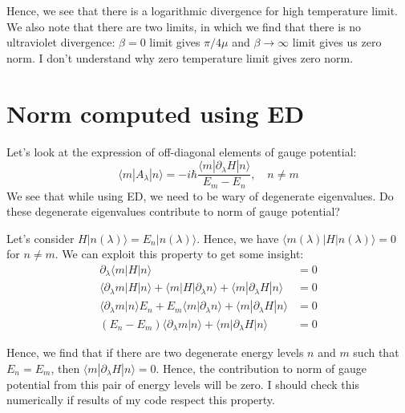\documentclass[11pt,a4paper]{article}
\begin{document}
Hence, we see that there is a logarithmic divergence for high temperature limit. We also note that there are two limits, in which we find that there is no ultraviolet divergence: $\beta =0$ limit gives $\pi/ 4 \mu$ and $\beta \rightarrow \infty$ limit gives us zero norm. I don't understand why zero temperature limit gives zero norm.


\section{Norm computed using ED}

Let's look at the expression of off-diagonal elements of gauge potential:
\begin{equation}
\langle m |A_{\lambda} | n \rangle =  -i \hbar \dfrac{\langle m |\partial_{\lambda}H | n \rangle}{E_m-E_n}, \quad n \neq m
\end{equation}
We see that while using ED, we need to be wary of degenerate eigenvalues. Do these degenerate eigenvalues contribute to norm of gauge potential?

Let's consider $H | n(\lambda) \rangle= E_n  | n(\lambda) \rangle $. Hence, we have $\langle m(\lambda)  |  H | n(\lambda) \rangle=0$ for $n\neq m$. We can exploit this property to get some insight:
\begin{align*}
\partial_{\lambda}\langle m  |  H | n\rangle&=0\\
\langle \partial_{\lambda} m |  H | n \rangle + \langle  m  |  H |\partial_{\lambda} n \rangle + \langle  m  | \partial_{\lambda} H | n \rangle&=0\\
\langle \partial_{\lambda} m   | n \rangle E_n + E_m\langle  m  |   \partial_{\lambda} n \rangle + \langle  m  | \partial_{\lambda} H | n \rangle&=0\\
(E_n - E_m)\langle  \partial_{\lambda} m  |    n \rangle + \langle  m  | \partial_{\lambda} H | n \rangle&=0
\end{align*}

Hence, we find that if there are two degenerate energy levels $n$ and $m$ such that $E_n=E_m$, then $\langle  m  | \partial_{\lambda} H | n \rangle=0$. Hence, the contribution to norm of gauge potential from this pair of energy levels will be zero. I should check this numerically if results of my code respect this property.
\end{document}
